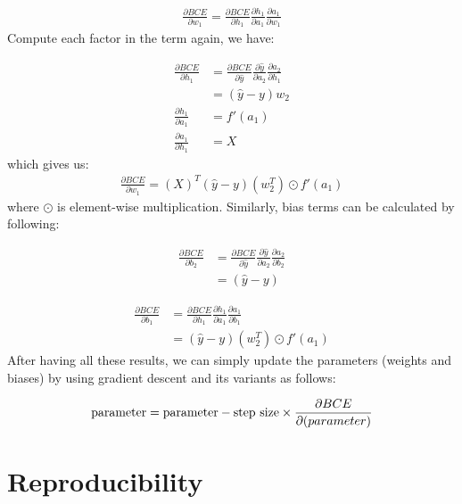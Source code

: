 \documentclass[
]{article}
\begin{document}
\[
\begin{aligned} 
\frac{\partial BCE}{\partial w_{1}}=\frac{\partial BCE}{\partial h_1} \frac{\partial h_1}{\partial a_{1}} \frac{\partial a_{1}}{\partial w_{1}}
\end{aligned}
\] Compute each factor in the term again, we have:

\[
\begin{aligned}
\frac{\partial BCE}{\partial h_1} &= \frac{\partial BCE}{\partial \hat{y}} \frac{\partial \hat{y}}{\partial a_{2}} \frac{\partial a_{2}}{\partial h_{1}}  \\
&= \left(\hat{y}-y\right) w_{2} \\
\frac{\partial h_1}{\partial a_{1}} &=f'(a_1) \\
\frac{\partial a_{1}}{\partial h_{1}} &=X
\end{aligned}
\] which gives us: \[
\begin{aligned}
\frac{\partial BCE}{\partial w_{1}}= \left(X\right)^T\left(\hat{y}-y\right)\left(w_{2}^T\right) \odot f'(a_1)
\end{aligned}
\] where \(\odot\) is element-wise multiplication. Similarly, bias terms
can be calculated by following:

\[
\begin{aligned} 
\frac{\partial BCE}{\partial b_{2}}&=\frac{\partial BCE}{\partial \hat{y}} \frac{\partial \hat{y}}{\partial a_{2}} \frac{\partial a_{2}}{\partial b_{2}} \\
&= \left(\hat{y}-y\right)
\end{aligned}
\]

\[
\begin{aligned} 
\frac{\partial BCE}{\partial b_{1}}&=\frac{\partial BCE}{\partial h_1} \frac{\partial h_1}{\partial a_{1}} \frac{\partial a_{1}}{\partial b_{1}} \\
&= \left(\hat{y}-y\right)\left(w_{2}^T\right) \odot f'(a_1)
\end{aligned}
\] After having all these results, we can simply update the parameters
(weights and biases) by using gradient descent and its variants as
follows:

\[
\begin{aligned} 
\text{parameter} &= \text{parameter} - \text{step size} \times \frac{\partial BCE}{\partial \text(parameter)}  \\
\end{aligned}
\]

\hypertarget{reproducibility}{%
\section{Reproducibility}\label{reproducibility}}
\end{document}

